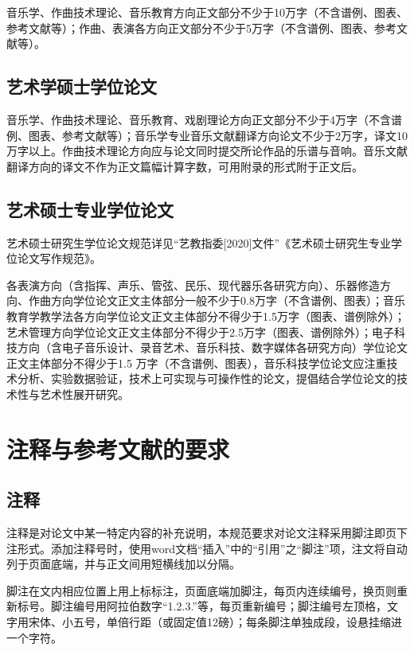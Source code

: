 音乐学、作曲技术理论、音乐教育方向正文部分不少于10万字（不含谱例、图表、参考文献等）；作曲、表演各方向正文部分不少于5万字（不含谱例、图表、参考文献等）。

\subsection{艺术学硕士学位论文}

音乐学、作曲技术理论、音乐教育、戏剧理论方向正文部分不少于4万字（不含谱例、图表、参考文献等）；音乐学专业音乐文献翻译方向论文不少于2万字，译文10万字以上。作曲技术理论方向应与论文同时提交所论作品的乐谱与音响。音乐文献翻译方向的译文不作为正文篇幅计算字数，可用附录的形式附于正文后。

\subsection{艺术硕士专业学位论文}

艺术硕士研究生学位论文规范详见“艺教指委[2020]文件”《艺术硕士研究生专业学位论文写作规范》。

各表演方向（含指挥、声乐、管弦、民乐、现代器乐各研究方向）、乐器修造方向、作曲方向学位论文正文主体部分一般不少于0.8万字（不含谱例、图表）；音乐教育学教学法各方向学位论文正文主体部分不得少于1.5万字（图表、谱例除外）；艺术管理方向学位论文正文主体部分不得少于2.5万字（图表、谱例除外）；电子科技方向（含电子音乐设计、录音艺术、音乐科技、数字媒体各研究方向）学位论文正文主体部分不得少于1.5 万字（不含谱例、图表），音乐科技学位论文应注重技术分析、实验数据验证，技术上可实现与可操作性的论文，提倡结合学位论文的技术性与艺术性展开研究。

\section{注释与参考文献的要求}

\subsection{注释}

注释是对论文中某一特定内容的补充说明，本规范要求对论文注释采用脚注即页下注形式。添加注释号时，使用word文档“插入”中的“引用”之“脚注”项，注文将自动列于页面底端，并与正文间用短横线加以分隔。

脚注在文内相应位置上用上标标注，页面底端加脚注，每页内连续编号，换页则重新标号。脚注编号用阿拉伯数字“1.2.3.”等，每页重新编号；脚注编号左顶格，文字用宋体、小五号，单倍行距（或固定值12磅）；每条脚注单独成段，设悬挂缩进一个字符。

